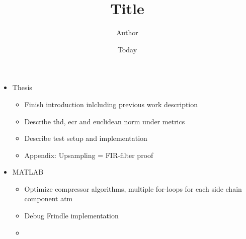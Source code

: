 \documentclass[]{article}
\begin{document}
\title{Title}
\author{Author}
\date{Today}
\maketitle
\begin{itemize}
\item{Thesis}
	\begin{itemize}
	\item{Finish introduction inlcluding previous work description}
	\item{Describe thd, ecr and euclidean norm under metrics}
	\item{Describe test setup and implementation}
	\item{Appendix: Upsampling = FIR-filter proof }
\end{itemize}
\item{MATLAB}
	\begin{itemize}
	\item{Optimize compressor algorithms, multiple for-loops for each side chain component atm}
	\item{Debug Frindle implementation}
	\item{}
	\end{itemize}
\end{itemize}
\end{document}
